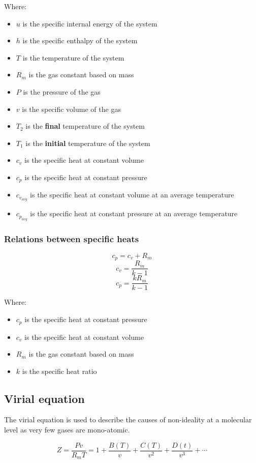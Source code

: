\documentclass[11pt]{article}
\begin{document}
Where:
\begin{itemize}
\item \(u\) is the specific internal energy of the system
\item \(h\) is the specific enthalpy of the system
\item \(T\) is the temperature of the system
\item \(R_m\) is the gas constant based on mass
\item \(P\) is the pressure of the gas
\item \(v\) is the specific volume of the gas
\item \(T_2\) is the \textbf{final} temperature of the system
\item \(T_1\) is the \textbf{initial} temperature of the system
\item \(c_v\) is the specific heat at constant volume
\item \(c_p\) is the specific heat at constant pressure
\item \(c_{v_{avg}}\) is the specific heat at constant volume at an average temperature
\item \(c_{p_{avg}}\) is the specific heat at constant pressure at an average temperature
\end{itemize}

\subsubsection{Relations between specific heats}
\label{sec:org20765ea}
\[c_p = c_v + R_m\]
\[c_v = \frac{R_m}{k - 1}\]
\[c_p = \frac{kR_m}{k - 1}\]

Where:
\begin{itemize}
\item \(c_p\) is the specific heat at constant pressure
\item \(c_v\) is the specific heat at constant volume
\item \(R_m\) is the gas constant based on mass
\item \(k\) is the specific heat ratio
\end{itemize}

\subsection{Virial equation}
\label{sec:org8067a7a}
The virial equation is used to describe the causes of non-ideality at a molecular level as very few gases are mono-atomic.

\[Z = \frac{Pv}{R_m T} = 1 + \frac{B(T)}{v} + \frac{C(T)}{v^2} + \frac{D(t)}{v^3} + \cdots\]
\end{document}
